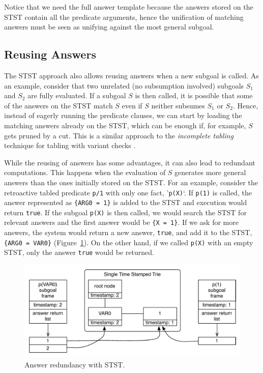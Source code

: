 Notice that we need the full answer template because the answers stored on the STST contain
all the predicate arguments, hence the unification of matching answers must be
seen as unifying against the most general subgoal.

\subsection{Reusing Answers}

The STST approach also allows reusing answers when a new subgoal is called.
As an example, consider that two unrelated (no subsumption involved) subgoals $S_1$
and $S_2$ are fully evaluated. If a subgoal $S$ is then called, it is possible
that some of the answers on the STST match $S$ even if $S$ neither subsumes
$S_1$ or $S_2$. Hence, instead of eagerly running the predicate clauses, we can start
by loading the matching answers already on the STST, which can be enough if,
for example, $S$ gets pruned by a cut. This is a similar approach to the \textit{incomplete
tabling} technique for tabling with variant checks \cite{Rocha-06a}.

While the reusing of answers has some advantages, it can also lead to redundant computations.
This happens when the evaluation of $S$ generates more general answers than the ones initially
stored on the STST. For an example, consider the retroactive
tabled predicate \texttt{p/1} with only one fact, '\texttt{p(X)}`. If \texttt{p(1)} is
called, the answer represented as \texttt{\{ARG0~=~1\}} is added to the STST and execution
would return \texttt{true}. If the subgoal \texttt{p(X)} is then called, we would search
the STST for relevant answers and the first answer would be \texttt{\{X~=~1\}}. If we
ask for more answers, the system would return a new answer, \texttt{true}, and add it
to the STST, \texttt{\{ARG0~=~VAR0\}} (Figure~\ref{fig:stst_redundant}). On the other hand,
if we called \texttt{p(X)} with an empty STST, only the answer \texttt{true} would be returned.

\begin{figure}[ht]
  \centering
    \includegraphics[scale=0.6]{stst_redundant.pdf}
  \caption{Answer redundancy with STST.}
  \label{fig:stst_redundant}
\end{figure}

